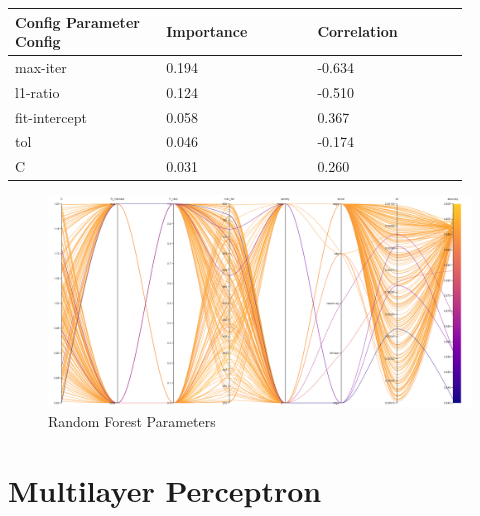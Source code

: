 \documentclass[11pt]{article}
\begin{document}
\begin{appendices}
  \begin{table}[ht]
    \centering
    \begin{tabular}{|p{0.3\linewidth} | p{0.3\linewidth}| p{0.3\linewidth}|} 
      \hline
      \textbf{Config Parameter Config}  & \textbf{Importance} & \textbf{Correlation} \\ \hline
      max-iter & 0.194 & -0.634 \\ \hline
      l1-ratio & 0.124 & -0.510 \\ \hline
      fit-intercept & 0.058 & 0.367 \\ \hline
      tol & 0.046 & -0.174 \\ \hline
      C & 0.031 & 0.260 \\ \hline
    \end{tabular}
  \end{table}\label{LC_ParamImp2}

\begin{figure}[h]
    \caption {Random Forest Parameters} \label{ParallelCoordLC}
    \centering 
    \includegraphics[width = \textwidth, height = \textwidth, keepaspectratio]{Images/LC ParallelCoordGraph.png}
\end{figure}

  \FloatBarrier
\newpage
\section{Multilayer Perceptron}


\end{appendices}
\end{document}
